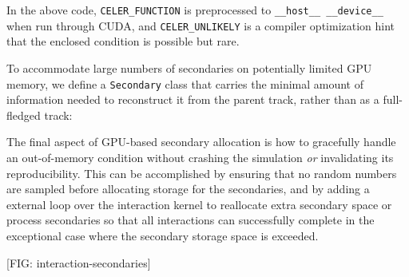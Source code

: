 In the above code, \texttt{CELER\_FUNCTION} is preprocessed to
\texttt{\_\_host\_\_\ \_\_device\_\_} when run through CUDA, and
\texttt{CELER\_UNLIKELY} is a compiler optimization hint that the
enclosed condition is possible but rare.

To accommodate large numbers of secondaries on potentially limited GPU
memory, we define a \texttt{Secondary} class that carries the minimal
amount of information needed to reconstruct it from the parent track,
rather than as a full-fledged track:

\begin{Shaded}
\begin{Highlighting}[]
\NormalTok{\{}

      \NormalTok{() }\NormalTok{;}
\NormalTok{\};}
\end{Highlighting}
\end{Shaded}

The final aspect of GPU-based secondary allocation is how to gracefully
handle an out-of-memory condition without crashing the simulation
\emph{or} invalidating its reproducibility. This can be accomplished by
ensuring that no random numbers are sampled before allocating storage
for the secondaries, and by adding a external loop over the interaction
kernel to reallocate extra secondary space or process secondaries so
that all interactions can successfully complete in the exceptional case
where the secondary storage space is exceeded.

{[}FIG: interaction-secondaries{]}
